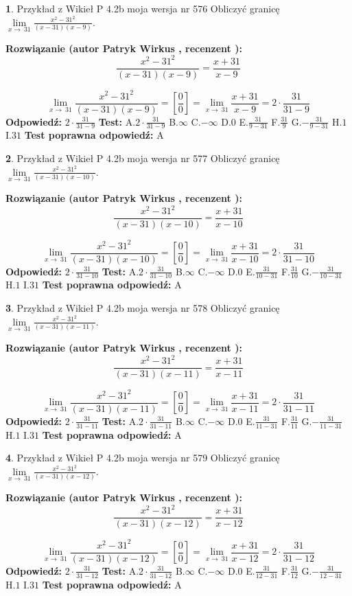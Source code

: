 \documentclass[12pt, a4paper]{article}
\theoremstyle{definition} %
\newtheorem{zad}{}
\newcommand{\zadStart}[1]{\begin{zad}#1\newline}
\newcommand{\zadStop}{\end{zad}}
\newcommand{\rozwStart}[2]{\noindent \textbf{Rozwiązanie (autor #1 , recenzent #2): }\newline}
\newcommand{\rozwStop}{\newline}
\newcommand{\odpStart}{\noindent \textbf{Odpowiedź:}\newline}
\newcommand{\odpStop}{\newline}
\newcommand{\testStart}{\noindent \textbf{Test:}\newline}
\newcommand{\testStop}{\newline}
\newcommand{\kluczStart}{\noindent \textbf{Test poprawna odpowiedź:}\newline}
\newcommand{\kluczStop}{\newline}
\begin{document}
\zadStart{Przykład z Wikieł P 4.2b moja wersja nr 576}
Obliczyć granicę $\lim\limits_{x\to\ 31}\frac{x^{2}-31^{2}}{(x-31)(x-9)}$.
\zadStop
\rozwStart{Patryk Wirkus}{}
$$\frac{x^{2}-31^{2}}{(x-31)(x-9)}=\frac{x+31}{x-9}$$

$$\lim\limits_{x\to\ 31}\frac{x^{2}-31^{2}}{(x-31)(x-9)}=[\frac{0}{0}]=\lim\limits_{x\to\ 31}\frac{x+31}{x-9}=2 \cdot \frac{31}{31-9}$$
\rozwStop
\odpStart
$2 \cdot \frac{31}{31-9}$
\odpStop
\testStart
A.$2 \cdot \frac{31}{31-9}$
B.$\infty$
C.$-\infty$
D.$0$
E.$\frac{31}{9-31}$
F.$\frac{31}{9}$
G.$-\frac{31}{9-31}$
H.$1$
I.$31$
\testStop
\kluczStart
A
\kluczStop



\zadStart{Przykład z Wikieł P 4.2b moja wersja nr 577}
Obliczyć granicę $\lim\limits_{x\to\ 31}\frac{x^{2}-31^{2}}{(x-31)(x-10)}$.
\zadStop
\rozwStart{Patryk Wirkus}{}
$$\frac{x^{2}-31^{2}}{(x-31)(x-10)}=\frac{x+31}{x-10}$$

$$\lim\limits_{x\to\ 31}\frac{x^{2}-31^{2}}{(x-31)(x-10)}=[\frac{0}{0}]=\lim\limits_{x\to\ 31}\frac{x+31}{x-10}=2 \cdot \frac{31}{31-10}$$
\rozwStop
\odpStart
$2 \cdot \frac{31}{31-10}$
\odpStop
\testStart
A.$2 \cdot \frac{31}{31-10}$
B.$\infty$
C.$-\infty$
D.$0$
E.$\frac{31}{10-31}$
F.$\frac{31}{10}$
G.$-\frac{31}{10-31}$
H.$1$
I.$31$
\testStop
\kluczStart
A
\kluczStop



\zadStart{Przykład z Wikieł P 4.2b moja wersja nr 578}
Obliczyć granicę $\lim\limits_{x\to\ 31}\frac{x^{2}-31^{2}}{(x-31)(x-11)}$.
\zadStop
\rozwStart{Patryk Wirkus}{}
$$\frac{x^{2}-31^{2}}{(x-31)(x-11)}=\frac{x+31}{x-11}$$

$$\lim\limits_{x\to\ 31}\frac{x^{2}-31^{2}}{(x-31)(x-11)}=[\frac{0}{0}]=\lim\limits_{x\to\ 31}\frac{x+31}{x-11}=2 \cdot \frac{31}{31-11}$$
\rozwStop
\odpStart
$2 \cdot \frac{31}{31-11}$
\odpStop
\testStart
A.$2 \cdot \frac{31}{31-11}$
B.$\infty$
C.$-\infty$
D.$0$
E.$\frac{31}{11-31}$
F.$\frac{31}{11}$
G.$-\frac{31}{11-31}$
H.$1$
I.$31$
\testStop
\kluczStart
A
\kluczStop



\zadStart{Przykład z Wikieł P 4.2b moja wersja nr 579}
Obliczyć granicę $\lim\limits_{x\to\ 31}\frac{x^{2}-31^{2}}{(x-31)(x-12)}$.
\zadStop
\rozwStart{Patryk Wirkus}{}
$$\frac{x^{2}-31^{2}}{(x-31)(x-12)}=\frac{x+31}{x-12}$$

$$\lim\limits_{x\to\ 31}\frac{x^{2}-31^{2}}{(x-31)(x-12)}=[\frac{0}{0}]=\lim\limits_{x\to\ 31}\frac{x+31}{x-12}=2 \cdot \frac{31}{31-12}$$
\rozwStop
\odpStart
$2 \cdot \frac{31}{31-12}$
\odpStop
\testStart
A.$2 \cdot \frac{31}{31-12}$
B.$\infty$
C.$-\infty$
D.$0$
E.$\frac{31}{12-31}$
F.$\frac{31}{12}$
G.$-\frac{31}{12-31}$
H.$1$
I.$31$
\testStop
\kluczStart
A
\kluczStop
\end{document}
